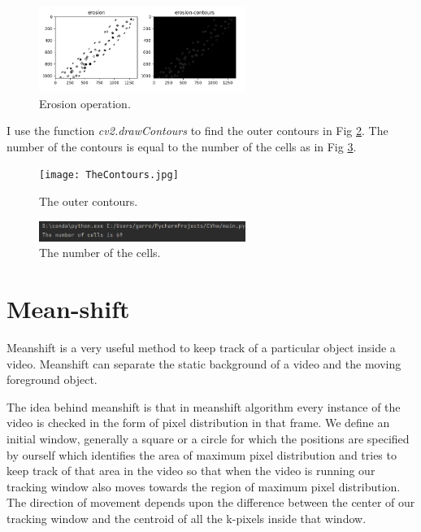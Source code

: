 \documentclass{article}
\begin{document}
\begin{figure} [H]
\centering
\includegraphics[width=0.6\textwidth]{Figure_3.png}
\caption{\label{fig:erosion}Erosion operation.}
\end{figure}

I use the function \emph{cv2.drawContours} to find the outer contours in Fig \ref{fig:Countours}. The number of the contours is equal to the number of the cells as in Fig \ref{fig:number}.
\begin{figure} [H]
\centering
\texttt{[image: TheContours.jpg]}
\caption{\label{fig:Countours}The outer contours.}
\end{figure}

\begin{figure} [H]
\centering
\includegraphics[width=0.6\textwidth]{number.png}
\caption{\label{fig:number}The number of the cells.}
\end{figure}

\section{Mean-shift}
Meanshift is a very useful method to keep track of a particular object inside a video. Meanshift can separate the static background of a video and the moving foreground object.

The idea behind meanshift is that in meanshift algorithm every instance of the video is checked in the form of pixel distribution in that frame. We define an initial window, generally a square or a circle for which the positions are specified by ourself which identifies the area of maximum pixel distribution and tries to keep track of that area in the video so that when the video is running our tracking window also moves towards the region of maximum pixel distribution. The direction of movement depends upon the difference between the center of our tracking window and the centroid of all the k-pixels inside that window.
\end{document}
